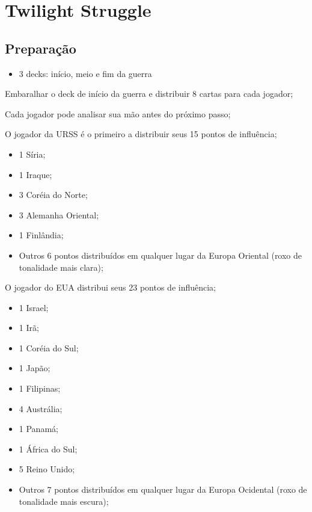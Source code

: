 \documentclass[11pt]{article}
\author{Fabio Favero Henkes}
\date{\today}
\title{}
\begin{document}
\tableofcontents

\section{Twilight Struggle}
\label{sec:orgc835147}

\subsection{Preparação}
\label{sec:orgadb0bbc}

\begin{itemize}
\item 3 decks: início, meio e fim da guerra
\end{itemize}

Embaralhar o deck de início da guerra e distribuir 8 cartas para cada jogador;

Cada jogador pode analisar sua mão antes do próximo passo;

O jogador da URSS é o primeiro a distribuir seus 15 pontos de influência;

\begin{itemize}
\item 1 Síria;
\item 1 Iraque;
\item 3 Coréia do Norte;
\item 3 Alemanha Oriental;
\item 1 Finlândia;
\item Outros 6 pontos distribuídos em qualquer lugar da Europa Oriental (roxo de tonalidade mais clara);
\end{itemize}

O jogador do EUA distribui seus 23 pontos de influência;

\begin{itemize}
\item 1 Israel;
\item 1 Irã;
\item 1 Coréia do Sul;
\item 1 Japão;
\item 1 Filipinas;
\item 4 Austrália;
\item 1 Panamá;
\item 1 África do Sul;
\item 5 Reino Unido;
\item Outros 7 pontos distribuídos em qualquer lugar da Europa Ocidental (roxo de tonalidade mais escura);
\end{itemize}
\end{document}
